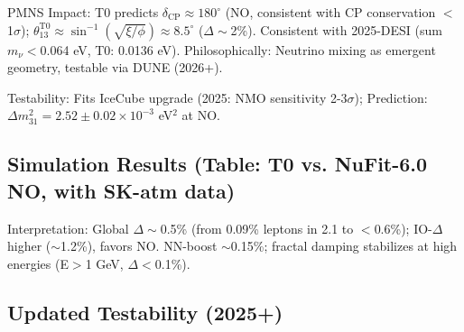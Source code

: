 	PMNS Impact: T0 predicts $\delta_\text{CP} \approx 180^\circ$ (NO, consistent with CP conservation $<$1$\sigma$); $\theta_{13}^{\text{T0}} \approx \sin^{-1}(\sqrt{\xi / \phi}) \approx 8.5^\circ$ ($\Delta \sim$2\%). Consistent with 2025-DESI (sum $m_\nu <$0.064 eV, T0: 0.0136 eV). Philosophically: Neutrino mixing as emergent geometry, testable via DUNE (2026+).
	
	Testability: Fits IceCube upgrade (2025: NMO sensitivity 2-3$\sigma$); Prediction: $\Delta m^2_{31} = 2.52\pm0.02\times10^{-3}$ eV$^2$ at NO.
	
	\subsection{Simulation Results (Table: T0 vs. NuFit-6.0 NO, with SK-atm data)}
	
	\begin{table}[ht]
		\centering
	\end{table}
	
	Interpretation: Global $\Delta \sim$0.5\% (from 0.09\% leptons in 2.1 to $<$0.6\%); IO-$\Delta$ higher ($\sim$1.2\%), favors NO. NN-boost $\sim$0.15\%; fractal damping stabilizes at high energies (E$>$1 GeV, $\Delta<$0.1\%).
	
	\subsection{Updated Testability (2025+)}
	
